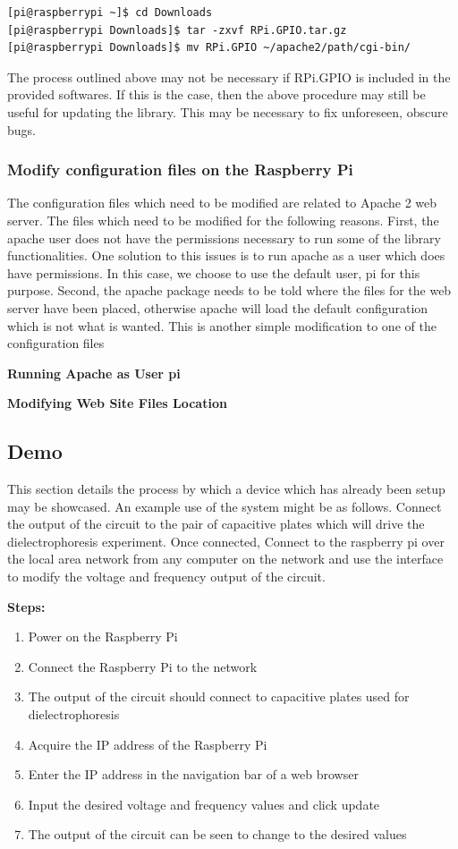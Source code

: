 \documentclass{article}	%
\begin{document}
\begin{multicols}{2}
\begin{lstlisting}
[pi@raspberrypi ~]$ cd Downloads
[pi@raspberrypi Downloads]$ tar -zxvf RPi.GPIO.tar.gz
[pi@raspberrypi Downloads]$ mv RPi.GPIO ~/apache2/path/cgi-bin/
\end{lstlisting}

The process outlined above may not be necessary if
RPi.GPIO is included in the provided softwares.
If this is the case, then
the above procedure may still be useful for updating
the library.
This may be necessary to fix unforeseen, obscure bugs.

\subsubsection{Modify configuration files on the Raspberry Pi}
The configuration files which need to be modified are
related to Apache 2 web server.
The files which need to be modified for the following reasons.
First, the apache user does not have the permissions necessary
to run some of the library functionalities.
One solution to this issues is to run apache as 
a user which does have permissions.
In this case,
we choose to use the default user, pi for this purpose.
Second, the apache package needs to be told where
the files for the web server have been placed,
otherwise apache will load the default configuration
which is not what is wanted.
This is another simple modification to one of the configuration files

\textbf{Running Apache as User pi}

\textbf{Modifying Web Site Files Location}

\subsection{Demo}
This section details the process
by which a device which has already
been setup may be showcased.
An example use of the system might be as follows.
Connect the output of the circuit to the pair
of capacitive plates which will drive 
the dielectrophoresis experiment.
Once connected,
Connect to the raspberry pi over
the local area network from
any computer on the network and
use the interface to modify the
voltage and frequency output of the circuit.

\textbf{Steps:}
\begin{enumerate}
\item{Power on the Raspberry Pi}
\item{Connect the Raspberry Pi to the network}
\item{The output of the circuit should connect to capacitive plates used for dielectrophoresis}
\item{Acquire the IP address of the Raspberry Pi}
\item{Enter the IP address in the navigation bar of a web browser}
\item{Input the desired voltage and frequency values and click update}
\item{The output of the circuit can be seen to change to the desired values}
\end{enumerate}


\end{multicols}
\end{document}
